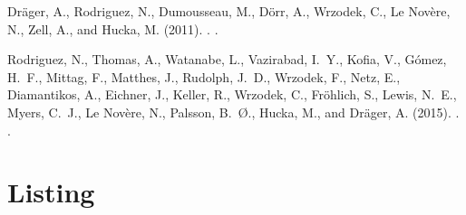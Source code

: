 \documentclass[letterpaper]{scrartcl}
\begin{document}
\begin{thebibliography}{}

Dr\"ager, A., Rodriguez, N., Dumousseau, M., D\"orr, A., Wrzodek, C., {Le
  Nov\`{e}re}, N., Zell, A., and Hucka, M. (2011).
.
.

Rodriguez, N., Thomas, A., Watanabe, L., Vazirabad, I.~Y., Kofia, V.,
  G\'{o}mez, H.~F., Mittag, F., Matthes, J., Rudolph, J.~D., Wrzodek, F., Netz,
  E., Diamantikos, A., Eichner, J., Keller, R., Wrzodek, C., Fr\"ohlich, S.,
  Lewis, N.~E., Myers, C.~J., {Le Nov\`{e}re}, N., Palsson, B.~{\O}., Hucka,
  M., and Dr\"ager, A. (2015).
.
.

\end{thebibliography}

\section{Listing}


\end{document}
